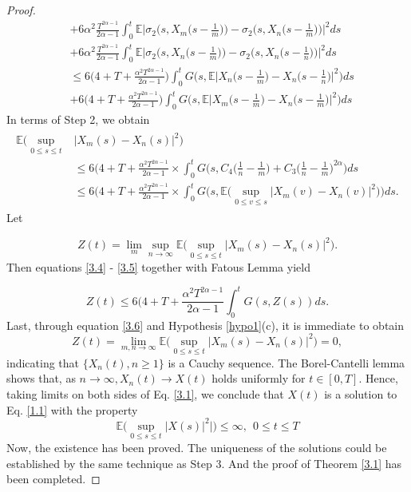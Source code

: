 \documentclass[a4 paper, 12pt]{report}
\theoremstyle{plain}
\begin{document}
\begin{proof}
\begin{align*}
&+6\alpha^2\frac{T^{2\alpha - 1}}{2\alpha - 1}\int_0^t\mathbb{E}\bigg|\sigma_2\bigg(s,X_m\bigg(s-\frac{1}{m}\bigg)\bigg) - \sigma_2\bigg(s,X_n\bigg(s - \frac{1}{m}\bigg)\bigg)\bigg|^2ds\\
&+6\alpha^2\frac{T^{2\alpha - 1}}{2\alpha - 1}\int_0^t\mathbb{E}\bigg|\sigma_2\bigg(s,X_n\bigg(s-\frac{1}{m}\bigg)\bigg) - \sigma_2\bigg(s,X_n\bigg(s - \frac{1}{n}\bigg)\bigg)\bigg|^2ds\\
&\leq 6\bigg(4+T+\frac{\alpha^2 T^{2\alpha -1}}{2\alpha -1}\bigg)\int_0^tG\bigg(s,\mathbb{E}\bigg| X_n\bigg(s-\frac{1}{m}\bigg) - X_n\bigg(s - \frac{1}{n}\bigg)\bigg|^2\bigg)ds\\
&+ 6\bigg(4+T+\frac{\alpha^2 T^{2\alpha -1}}{2\alpha -1}\bigg)\int_0^tG\bigg(s,\mathbb{E}\bigg| X_m\bigg(s-\frac{1}{m}\bigg) - X_n\bigg(s - \frac{1}{m}\bigg)\bigg|^2\bigg)ds
\end{align*}
In terms of Step 2, we obtain
\begin{align}\label{3.4}
\begin{split}
\mathbb{E}\bigg(\sup_{0\leq s\leq t}&|X_m(s) - X_n(s)|^2\bigg)\\
&\leq 6\bigg(4+T+\frac{\alpha^2T^{2\alpha - 1}}{2\alpha -1} \times \int_0^tG\bigg(s,C_4\bigg(\frac{1}{n} - \frac{1}{m})+C_3\bigg(\frac{1}{n} - \frac{1}{m}\bigg)^{{2\alpha}}\bigg)ds\\
&\leq 6\bigg(4+T+\frac{\alpha^2T^{2\alpha - 1}}{2\alpha -1} \times \int_0^tG\bigg(s,\mathbb{E}\bigg(\sup_{0\leq v\leq s}|X_m(v) - X_n(v)|^2\bigg)\bigg)ds.
\end{split}
\end{align}
Let 

\begin{equation}\label{3.5}
Z(t) = \lim_{m}\sup_{n\rightarrow\infty}\mathbb{E}\bigg(\sup_{0\leq s\leq t}|X_m(s) - X_n(s)|^2\bigg).
\end{equation}
Then equations \eqref{3.4} - \eqref{3.5} together with Fatous Lemma yield

\begin{equation}\label{3.6}
Z(t)\leq 6\bigg(4+T+\frac{\alpha^2T^{2\alpha-1}}{2\alpha -1}\int_0^tG(s,Z(s))ds.
\end{equation}
Last, through equation \eqref{3.6} and Hypothesis \ref{hypo1}(c), it is immediate to obtain
$$
Z(t) = \lim_{m,n\rightarrow\infty}\mathbb{E}\bigg(\sup_{0\leq s\leq t}|X_m(s) - X_n(s)|^2\bigg) = 0,
$$
indicating that $\{X_n(t), n \geq 1\}$ is a Cauchy sequence. The Borel-Cantelli lemma
shows that, as $n \rightarrow \infty, X_n(t) \rightarrow X(t)$ holds uniformly for $t \in [0, T]$. Hence, taking
limits on both sides of Eq. \eqref{3.1}, we conclude that $X(t)$ is a solution to Eq. \eqref{1.1}
with the property
\begin{equation}\label{3.7}
\mathbb{E}\bigg(\sup_{0\leq s\leq t}|X(s)|^2|\bigg)\leq\infty,~~0\leq t\leq T
\end{equation}
Now, the existence has been proved. The uniqueness of the solutions could be
established by the same technique as Step 3. And the proof of Theorem \ref{3.1} has
been completed.
\end{proof}
\end{document}
